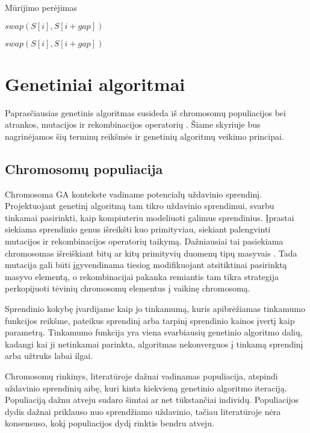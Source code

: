 \documentclass{VUMIFInfKursinis}
\begin{document}
\begin{algorithm}[H]
  \caption{Mūrijimo perėjimas}\label{alg:brick_pass}
  \begin{algorithmic}[1]
        \State $swap(S[i], S[i+gap])$
      \EndIf
    \EndFor

        \State $swap(S[i], S[i+gap])$
      \EndIf
    \EndFor
  \end{algorithmic}
\end{algorithm}

\section{Genetiniai algoritmai}

Paprasčiausias genetinis algoritmas susideda iš chromosomų populiacijos bei atrankos, mutacijos ir rekombinacijos operatorių \cite{simpson1999faster}.
Šiame skyriuje bus nagrinėjamos šių terminų reikšmės ir genetinių algoritmų veikimo principai.

\subsection{Chromosomų populiacija}

Chromosoma GA kontekste vadiname potencialų uždavinio sprendinį.
Projektuojant genetinį algoritmą tam tikro uždavinio sprendimui, svarbu tinkamai pasirinkti,
kaip kompiuteriu modeliuoti galimus sprendinius.
Įprastai siekiama sprendinio genus išreikšti kuo primityviau, siekiant
palengvinti mutacijos ir rekombinacijos operatorių taikymą.
Dažniausiai tai pasiekiama chromosomas išreiškiant bitų ar kitų primityvių duomenų tipų masyvais \cite{whitley1994genetic}.
Tada mutacija gali būti įgyvendinama tiesiog modifikuojant atsitiktinai pasirinktą masyvo elementą,
o rekombinacijai pakanka remiantis tam tikra strategija perkopijuoti tėvinių chromosomų elementus į vaikinę chromosomą.

Sprendinio kokybę įvardijame kaip jo tinkamumą, kuris apibrėžiamas tinkamumo funkcijos reikšme, pateikus sprendinį arba tarpinį sprendinio kainos įvertį kaip parametrą.
Tinkamumo funkcija yra viena svarbiausių genetinio algoritmo dalių,
kadangi kai ji netinkamai parinkta, algoritmas nekonverguos į tinkamą sprendinį arba užtruks labai ilgai.

Chromosomų rinkinys, literatūroje dažnai vadinamas populiacija, atspindi uždavinio sprendinių aibę, kuri kinta kiekvieną genetinio algoritmo iteraciją.
Populiaciją dažnu atveju sudaro šimtai ar net tūkstančiai individų.
Populiacijos dydis dažnai priklauso nuo sprendžiamo uždavinio,
tačiau literatūroje nėra konsensuso, kokį populiacijos dydį rinktis bendru atveju.
\end{document}
